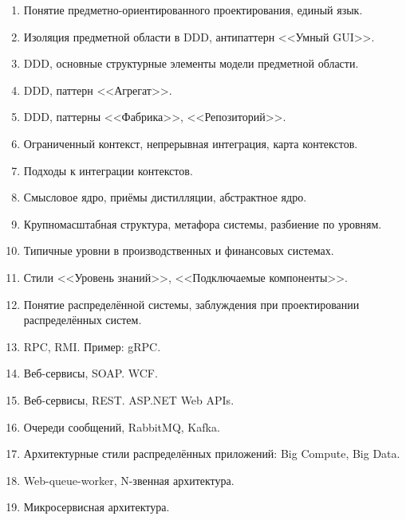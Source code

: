 \documentclass[a5paper]{article}
\begin{document}
\begin{enumerate}
    \item Понятие предметно-ориентированного проектирования, единый язык.
    \item Изоляция предметной области в DDD, антипаттерн <<Умный GUI>>.
    \item DDD, основные структурные элементы модели предметной области.
    \item DDD, паттерн <<Агрегат>>.
    \item DDD, паттерны <<Фабрика>>, <<Репозиторий>>.
    \item Ограниченный контекст, непрерывная интеграция, карта контекстов.
    \item Подходы к интеграции контекстов.
    \item Смысловое ядро, приёмы дистилляции, абстрактное ядро.
    \item Крупномасштабная структура, метафора системы, разбиение по уровням. 
    \item Типичные уровни в производственных и финансовых системах.
    \item Стили <<Уровень знаний>>, <<Подключаемые компоненты>>.
    \item Понятие распределённой системы, заблуждения при проектировании распределённых систем.
    \item RPC, RMI. Пример: gRPC.
    \item Веб-сервисы, SOAP. WCF.
    \item Веб-сервисы, REST. ASP.NET Web APIs.
    \item Очереди сообщений, RabbitMQ, Kafka.
    \item Архитектурные стили распределённых приложений: Big Compute, Big Data.
    \item Web-queue-worker, N-звенная архитектура.
    \item Микросервисная архитектура.

\end{enumerate}
\end{document}
